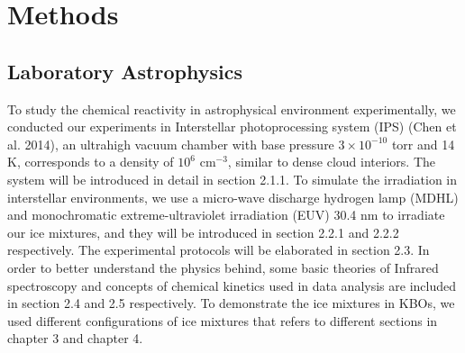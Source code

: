 \chapter{\protect Methods}

\section{Laboratory Astrophysics}
To study the chemical reactivity in astrophysical environment experimentally,
we conducted our experiments in Interstellar photoprocessing system (IPS) (Chen et al. 2014),
an ultrahigh vacuum chamber with base pressure $3 \times 10^{-10}$ torr and 14 K,
corresponds to a density of $10^6$ cm$^{-3}$, similar to dense cloud interiors.
The system will be introduced in detail in section 2.1.1.
To simulate the irradiation in interstellar environments,
we use a micro-wave discharge hydrogen lamp (MDHL) and monochromatic extreme-ultraviolet irradiation (EUV) 30.4 nm to irradiate our ice mixtures,
and they will be introduced in section 2.2.1 and 2.2.2 respectively.
The experimental protocols will be elaborated in section 2.3.
In order to better understand the physics behind, some basic theories of Infrared spectroscopy and concepts of chemical kinetics used in data analysis are included in section 2.4 and 2.5 respectively.
To demonstrate the ice mixtures in KBOs, we used different configurations of ice mixtures that refers to different sections in chapter 3 and chapter 4.
